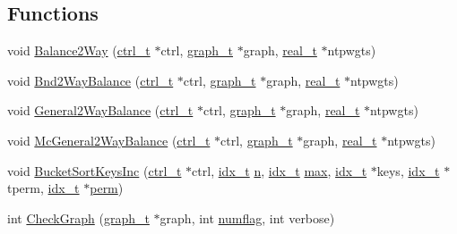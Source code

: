 \subsection*{Functions}
\begin{DoxyCompactItemize}
\item 
void \hyperlink{a00945_a11bd5be7764194a2bb8d6cfe580a30b8}{Balance2\+Way} (\hyperlink{a00742}{ctrl\+\_\+t} $\ast$ctrl, \hyperlink{a00734}{graph\+\_\+t} $\ast$graph, \hyperlink{a00876_a1924a4f6907cc3833213aba1f07fcbe9}{real\+\_\+t} $\ast$ntpwgts)
\item 
void \hyperlink{a00945_ab06911b71a6e285ceb52bb80b6592e79}{Bnd2\+Way\+Balance} (\hyperlink{a00742}{ctrl\+\_\+t} $\ast$ctrl, \hyperlink{a00734}{graph\+\_\+t} $\ast$graph, \hyperlink{a00876_a1924a4f6907cc3833213aba1f07fcbe9}{real\+\_\+t} $\ast$ntpwgts)
\item 
void \hyperlink{a00945_a726f3ab2e1dbf55fcf3c6a31037542f5}{General2\+Way\+Balance} (\hyperlink{a00742}{ctrl\+\_\+t} $\ast$ctrl, \hyperlink{a00734}{graph\+\_\+t} $\ast$graph, \hyperlink{a00876_a1924a4f6907cc3833213aba1f07fcbe9}{real\+\_\+t} $\ast$ntpwgts)
\item 
void \hyperlink{a00945_a765ccbdaa41401e55a2b6d350964f289}{Mc\+General2\+Way\+Balance} (\hyperlink{a00742}{ctrl\+\_\+t} $\ast$ctrl, \hyperlink{a00734}{graph\+\_\+t} $\ast$graph, \hyperlink{a00876_a1924a4f6907cc3833213aba1f07fcbe9}{real\+\_\+t} $\ast$ntpwgts)
\item 
void \hyperlink{a00945_a255cc560df2c972c98aaf88644587f6d}{Bucket\+Sort\+Keys\+Inc} (\hyperlink{a00742}{ctrl\+\_\+t} $\ast$ctrl, \hyperlink{a00876_aaa5262be3e700770163401acb0150f52}{idx\+\_\+t} \hyperlink{a00623_a781a04ab095280f838ff3eb0e51312e0}{n}, \hyperlink{a00876_aaa5262be3e700770163401acb0150f52}{idx\+\_\+t} \hyperlink{a00593_affe776513b24d84b39af8ab0930fef7f}{max}, \hyperlink{a00876_aaa5262be3e700770163401acb0150f52}{idx\+\_\+t} $\ast$keys, \hyperlink{a00876_aaa5262be3e700770163401acb0150f52}{idx\+\_\+t} $\ast$tperm, \hyperlink{a00876_aaa5262be3e700770163401acb0150f52}{idx\+\_\+t} $\ast$\hyperlink{a00879_ab96e9eb84fc7c342d17690a1341645dd}{perm})
\item 
int \hyperlink{a00945_a3fb602d633b7a36fa4027c192ed7eb45}{Check\+Graph} (\hyperlink{a00734}{graph\+\_\+t} $\ast$graph, int \hyperlink{a00879_aa48ecaf34ec788199c3aedb2b1558eb7}{numflag}, int verbose)
\item 

\end{DoxyCompactItemize}

